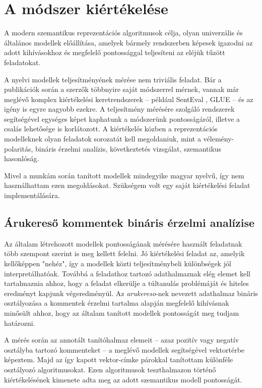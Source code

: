 \chapter{A módszer kiértékelése}
\label{ch:eval}

A modern szemantikus reprezentációs algoritmusok célja, olyan univerzális és általános modellek előállítása, amelyek bármely rendszerben képesek igazodni az adott kihívásokhoz és megfelelő pontossággal teljesíteni az eléjük tűzött feladatokat.

A nyelvi modellek teljesítményének mérése nem triviális feladat. Bár a publikációk során a szerzők többnyire saját módszerrel mérnek, vannak már meglévő komplex kiértékelési keretrendszerek – például SentEval \cite{senteval}, GLUE \cite{glue} – és az igény is egyre nagyobb ezekre. A teljesítmény mérésére szolgáló rendszerek segítségével egységes képet kaphatunk a módszerünk pontosságáról, illetve a csalás lehetősége is korlátozott. A kiértékelés közben a reprezentációs modelleknek olyan feladatok sorozatát kell megoldaniuk, mint a vélemény-polaritás, bináris érzelmi analízis, következtetés vizsgálat, szemantikus hasonlóság.

Mivel a munkám során tanított modellek mindegyike magyar nyelvű, így nem használhattam ezen megoldásokat. Szükségem volt egy saját kiértékelési feladat implementálására.

\section{Árukereső kommentek bináris érzelmi analízise}

Az általam létrehozott modellek pontosságának mérésére használt feladatnak több szempont szerint is meg kellett felelni. Jó kiértékelési feladat az, amelyik kellőképpen "nehéz", így a modellek közti teljesítménybeli különbségek jól interpretálhatóak. Továbbá a feladathoz tartozó adathalmaznak elég elemet kell tartalmaznia ahhoz, hogy a feladat elkerülje a túltanulás problémáját és hiteles eredményt kapjunk végeredményül. Az \textit{arukereso}-nek nevezett adathalmaz bináris osztályozása a kommentek érzelmi tartalma alapján megfelelő kihívásnak minősült ahhoz, hogy az általam tanított modellek pontosságát meg tudjam határozni.

A mérés során az annotált tanítóhalmaz elemeit – azaz pozitív vagy negatív osztályba tartozó kommenteket – a meglévő modellek segítségével vektortérbe képeztem. Majd az így kapott vektor-címke párokkal tanítottam különféle osztályozó algoritmusokat. Ezen algoritmusok teszthalmazon történő kiértékelésének kimenete adta meg az adott szemantikus modell pontosságát.

